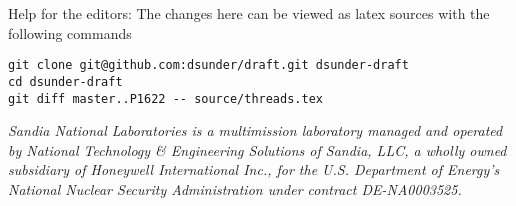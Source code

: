 \vspace*{\fill}

Help for the editors: The changes here can be viewed as latex sources with the following commands
\begin{verbatim}
git clone git@github.com:dsunder/draft.git dsunder-draft
cd dsunder-draft
git diff master..P1622 -- source/threads.tex
\end{verbatim}


\textit{Sandia National Laboratories is a multimission laboratory managed and operated
by National Technology \& Engineering Solutions of Sandia, LLC, a wholly owned
subsidiary of Honeywell International Inc., for the U.S. Department of Energy’s
National Nuclear Security Administration under contract DE-NA0003525.
}
\newpage
